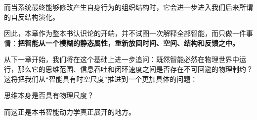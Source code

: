 而当系统最终能够修改产生自身行为的组织结构时，它会进一步进入我们后来所谓的自反结构演化。

因此，本章作为整本书认识论的开端，并不试图一次解释全部智能，而只做一件事情：\textbf{把智能从一个模糊的静态属性，重新放回时间、空间、结构和反馈之中。}

从下一章开始，我们将在这个基础上进一步追问：既然智能必然在物理世界中运行，那么它的思维范围、信息吞吐和闭环速度之间是否存在不可回避的物理制约？这将把我们从“智能具有时空尺度”推进到一个更加具体的问题：

\begin{statementbox}
思维本身是否具有物理尺度？
\end{statementbox}

而这正是本书智能动力学真正展开的地方。
